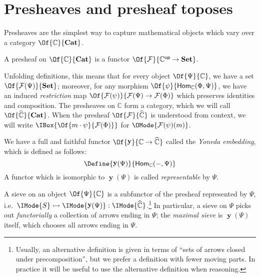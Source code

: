 \documentclass{article}
\newcommand\Cats{\mathbf{Cat}}
\newcommand\Sets{\mathbf{Set}}
\newcommand\OpCat[1]{{{#1}^{\mathsf{op}}}}
\newcommand\Hom[3]{\mathsf{Hom}_{#1} (#2, #3)}
\DeclareMathOperator\OpYoneda{\mathbf{y}}
\newcommand\Yoneda[1]{\OpYoneda({#1})}
\newcommand\Psh[1]{\widehat{#1}}
\newcommand\IsSubobject[3]{\IMode{#1}\rightarrowtail\IMode{#2}:\IMode{#3}}
\begin{document}
\section{Presheaves and presheaf toposes}
Presheaves are the simplest way to capture mathematical objects which
vary over a category $\Of{\mathbb{C}}{\Cats}$.

\begin{definition}[Presheaf]
  A presheaf on $\Of{\mathbb{C}}{\Cats}$ is a functor
  $\Of{\mathcal{F}}{\OpCat{\mathbb{C}}\to\Sets}$.
\end{definition}

Unfolding definitions, this means that for every object
$\Of{\Psi}{\mathbb{C}}$, we have a set
$\Of{\mathcal{F}(\Psi)}{\Sets}$; moreover, for any morphism
$\Of{\psi}{\Hom{\mathbb{C}}{\Phi}{\Psi}}$, we have an induced
\emph{restriction} map
$\Of{\mathcal{F}(\psi)}{\mathcal{F}(\Psi)\to \mathcal{F}(\Phi)}$ which preserves
identities and composition.
%
The presheaves on $\mathbb{C}$ form a category, which we will call
$\Of{\Psh{\mathbb{C}}}{\Cats}$.  When the presheaf
$\Of{\mathcal{F}}{\Psh{\mathbb{C}}}$ is understood from context, we
will write $\IBox{\Of{m\cdot \psi}{\mathcal{F}(\Phi)}}$ for
$\OMode{\mathcal{F}(\psi)(m)}$.

\begin{definition}
  We have a full and faithful functor
  $\Of{\OpYoneda}{\mathbb{C}\to\Psh{\mathbb{C}}}$ called the
  \emph{Yoneda embedding}, which is defined as follows:
  \[
    \Define{
      \Yoneda{\Psi}
    }{
      \Hom{\mathbb{C}}{-}{\Psi}
    }
  \]
  A functor which is isomorphic to $\Yoneda{\Psi}$ is called
  \emph{representable} by $\Psi$.
\end{definition}

\begin{definition}[Sieve]
  A sieve on an object $\Of{\Psi}{\mathbb{C}}$ is a subfunctor of the
  presheaf represented by $\Psi$, i.e.\
  $\IsSubobject{S}{\Yoneda{\Psi}}{\Psh{\mathbb{C}}}$.\footnote{Usually, an alternative
    definition is given in terms of ``sets of arrows closed under
    precomposition'', but we prefer a definition with fewer moving
    parts. In practice it will be useful to use the alternative
    definition when reasoning.}
%
  In particular, a sieve on $\Psi$ picks out \emph{functorially} a
  collection of arrows ending in $\Psi$; the \emph{maximal sieve} is
  $\Yoneda{\Psi}$ itself, which chooses all arrows ending in $\Psi$.
\end{definition}
\end{document}
